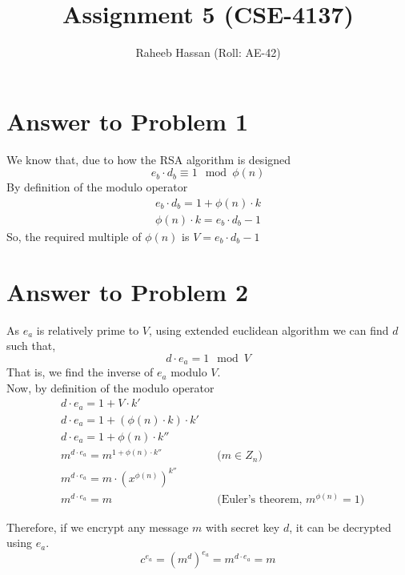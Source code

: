 \documentclass{article}
\title{Assignment 5 (CSE-4137)}
\author{Raheeb Hassan (Roll: AE-42)}
\begin{document}
\maketitle

\section*{Answer to Problem 1}

We know that, due to how the RSA algorithm is designed
\begin{equation*}
    e_b \cdot d_b \equiv 1 \mod \phi(n)
\end{equation*}
By definition of the modulo operator
\begin{align*}
    e_b \cdot d_b = 1 + \phi(n) \cdot k \\
    \phi(n) \cdot k = e_b \cdot d_b - 1
\end{align*}
So, the required multiple of $\phi(n)$ is $V = e_b \cdot d_b - 1$

\section*{Answer to Problem 2}

As $e_a$ is relatively prime to $V$, using extended euclidean algorithm we can find $d$ such that,
\begin{equation*}
    d \cdot e_a = 1 \mod V
\end{equation*}
That is, we find the inverse of $e_a$ modulo $V$.\\
Now, by definition of the modulo operator
\begin{align*}
    &d \cdot e_a = 1 + V \cdot k'\\
    &d \cdot e_a = 1 + (\phi(n) \cdot k) \cdot k'\\
    &d \cdot e_a = 1 + \phi(n) \cdot k''\\
    &m ^ {d \cdot e_a} = m ^ {1 + \phi(n) \cdot k''} & & \text{($m \in Z_n$)}\\
    &m ^ {d \cdot e_a} = m \cdot {(x ^ {\phi(n)})} ^ {k''}\\ 
    &m ^ {d \cdot e_a} = m & & \text{(Euler's theorem, $m^{\phi(n)} = 1$)}
\end{align*}

Therefore, if we encrypt any message $m$ with secret key $d$, it can be decrypted using $e_a$.
\begin{equation*}
    c ^ {e_a} = (m ^ d) ^ {e_a} = m ^ {d \cdot e_a} = m
\end{equation*}
\end{document}

